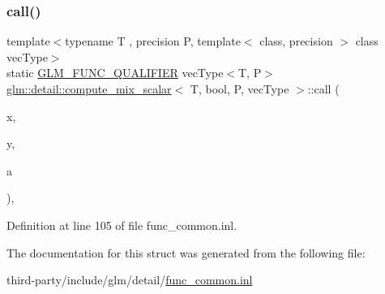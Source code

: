 \subsubsection{\texorpdfstring{call()}{call()}}
{\footnotesize\ttfamily template$<$typename T , precision P, template$<$ class, precision $>$ class vec\+Type$>$ \\
static \hyperlink{setup_8hpp_a33fdea6f91c5f834105f7415e2a64407}{G\+L\+M\+\_\+\+F\+U\+N\+C\+\_\+\+Q\+U\+A\+L\+I\+F\+I\+ER} vec\+Type$<$T, P$>$ \hyperlink{structglm_1_1detail_1_1compute__mix__scalar}{glm\+::detail\+::compute\+\_\+mix\+\_\+scalar}$<$ T, bool, P, vec\+Type $>$\+::call (\begin{DoxyParamCaption}\item[{vec\+Type$<$ T, P $>$ const \&}]{x,  }\item[{vec\+Type$<$ T, P $>$ const \&}]{y,  }\item[{bool const \&}]{a }\end{DoxyParamCaption})\hspace{0.3cm}{\ttfamily [inline]}, {\ttfamily [static]}}



Definition at line 105 of file func\+\_\+common.\+inl.



The documentation for this struct was generated from the following file\+:\begin{DoxyCompactItemize}
\item 
third-\/party/include/glm/detail/\hyperlink{func__common_8inl}{func\+\_\+common.\+inl}\end{DoxyCompactItemize}
